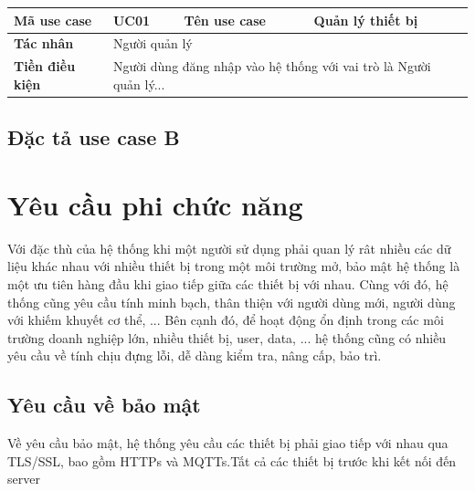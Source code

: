 \documentclass[../DoAn.tex]{subfiles}
\begin{document}

            
    



\begin{tabular}{|l|l|l|p{4cm}|}
\hline
\textbf{Mã use case} & \textbf{UC01} & \textbf{Tên use case} & \textbf{Quản lý thiết bị} \\ \hline
\textbf{Tác nhân} & \multicolumn{3}{l|}{Người quản lý} \\ \hline
\textbf{Tiền điều kiện} & \multicolumn{3}{p{9cm}|}{Người dùng đăng nhập vào hệ thống với vai trò là Người quản lý...} \\ \hline

\end{tabular}


\subsection{Đặc tả use case B}
\hfill

\section{Yêu cầu phi chức năng}
\label{section:2.4}

Với đặc thù của hệ thống khi một người sử dụng phải quan lý rât nhiều các dữ liệu khác nhau với nhiều thiết bị trong một môi trường mở, bảo mật hệ thống là một ưu tiên hàng đầu khi giao tiếp giữa các thiết bị với nhau. Cùng với đó, hệ thống cũng yêu cầu tính minh bạch, thân thiện với người dùng mới, người dùng với khiếm khuyết cơ thể, ... Bên cạnh đó, để hoạt động ổn định trong các môi trường doanh nghiệp lớn, nhiều thiết bị, user, data, ... hệ thống cũng có nhiều yêu cầu về tính chịu đựng lỗi, dễ dàng kiểm tra, nâng cấp, bảo trì.

\subsection{Yêu cầu về bảo mật}
Về yêu cầu bảo mật, hệ thống yêu cầu các thiết bị phải giao tiếp với nhau qua TLS/SSL, bao gồm HTTPs và MQTTs.Tất cả các thiết bị trước khi kết nối đến server 
\end{document}
